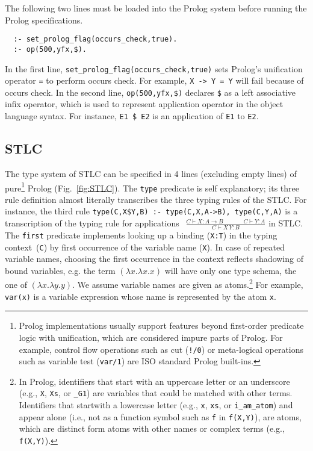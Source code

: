 \documentclass[runningheads,a4paper]{llncs}
\begin{document}
The following two lines must be loaded into the Prolog system
before running the Prolog specifications.
\begin{verbatim}
  :- set_prolog_flag(occurs_check,true).
  :- op(500,yfx,$).
\end{verbatim} \noindent
In the first line, \verb|set_prolog_flag(occurs_check,true)|
sets Prolog's unification operator \verb|=| to perform occurs check.
For example, \verb|X -> Y = Y| will fail because of occurs check.
In the second line, \verb|op(500,yfx,$)| declares \verb|$|
as a left associative infix operator, which is used to represent
application operator in the object language syntax. For instance,
\verb|E1 $ E2| is an application of \verb|E1| to
\verb|E2|.

\subsection{STLC}\label{ssec:STLC}
The type system of STLC can be specified in 4 lines
(excluding empty lines) of pure\footnote{
    Prolog implementations usually support features beyond
    first-order predicate logic with unification, which are
    considered impure parts of Prolog. For example,
    control flow operations such as cut (\texttt{!/0}) or
    meta-logical operations such as variable test (\texttt{var/1}) are
    ISO standard Prolog built-ins.} Prolog (Fig.~\ref{fig:STLC}).
The \verb|type| predicate is self explanatory; its three rule
definition almost literally transcribes the three typing rules of
the STLC. For instance, the third rule
\texttt{\small type(C,X\$Y,B) :- type(C,X,A->B), type(C,Y,A)}
is a transcription of the typing rule for applications
$~~\frac{C\vdash X:A\to B\qquad~~\quad C\vdash Y:A}{C\vdash X\,Y:B}$ in STLC.
The \verb|first| predicate implements looking up a binding
(\verb|X:T|) in the typing context~(\verb|C|)
by first occurrence of the variable name (\verb|X|).
In case of repeated variable names, choosing the first occurrence in the context reflects shadowing of bound variables,
e.g. the term $(\lambda x. \lambda x. x)$ will have only one type schema, the one of $(\lambda x. \lambda y. y)$.
We assume variable names are given as atoms.\footnote{
    In Prolog, identifiers that start with an uppercase letter or
    an underscore (e.g., \texttt{X}, \texttt{Xs}, or \texttt{\_G1}) are
    variables that could be matched with other terms. Identifiers that
    startwith a lowercase letter (e.g., \texttt{x}, \texttt{xs}, or
    \texttt{i\_am\_atom}) and appear alone (i.e., not as a function symbol
    such as \texttt{f} in \texttt{f(X,Y)}), are atoms, which are
    distinct form atoms with other names or complex terms
    (e.g., \texttt{f(X,Y)}).} For example, \verb|var(x)| is
a variable expression whose name is represented by the atom \verb|x|.
\end{document}
